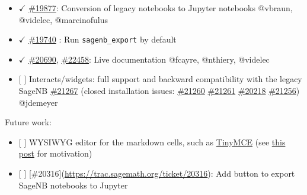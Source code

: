 \begin{itemize}
\tightlist
\item
  \(\checkmark\) \href{https://trac.sagemath.org/ticket/19877}{\#19877}:
  Conversion of legacy notebooks to Jupyter notebooks @vbraun, @videlec,
  @marcinofulus
\item
  \(\checkmark\) \href{https://trac.sagemath.org/ticket/19740}{\#19740}
  : Run \texttt{sagenb\_export} by default
\item
  \(\checkmark\) \href{http://trac.sagemath.org/ticket/20690}{\#20690},
  \href{http://trac.sagemath.org/ticket/22458}{\#22458}: Live
  documentation @fcayre, @nthiery, @videlec
\item
  {[} {]} Interacts/widgets: full support and backward compatibility
  with the legacy SageNB
  \href{https://trac.sagemath.org/ticket/21267}{\#21267} (closed
  installation issues:
  \href{https://trac.sagemath.org/ticket/21260}{\#21260}
  \href{https://trac.sagemath.org/ticket/21261}{\#21261}
  \href{https://trac.sagemath.org/ticket/20218}{\#20218}
  \href{https://trac.sagemath.org/ticket/21256}{\#21256}) @jdemeyer
\end{itemize}

Future work:

\begin{itemize}
\tightlist
\item
  {[} {]} WYSIWYG editor for the markdown cells, such as
  \href{https://www.tinymce.com/}{TinyMCE} (see
  \href{https://groups.google.com/d/msg/sage-devel/t11JSxxCgpw/BR0Bt638AgAJ}{this
  post} for motivation)
\item
  {[} {]} {[}\#20316{]}(\url{https://trac.sagemath.org/ticket/20316}):
  Add button to export SageNB notebooks to Jupyter
\end{itemize}
